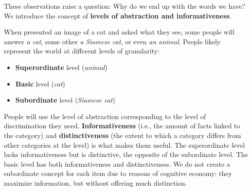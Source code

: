 These observations raise a question: Why do we end up with the words we have?
We introduce the concept of \textbf{levels of abstraction and informativeness}.

When presented an image of a cat and asked what they see, some people will answer \textit{a cat}, some other \textit{a Siamese cat}, or even \textit{an animal}.
People likely represent the world at different levels of 
granularity:
\begin{itemize}
    \item \textbf{Superordinate} level (\textit{animal})
    \item \textbf{Basic} level (\textit{cat})
    \item \textbf{Subordinate} level (\textit{Siamese cat})
\end{itemize}
People will use the level of abstraction corresponding to the level of discrimination they need. 
\textbf{Informativeness} (i.e., the amount of facts linked to the category) and \textbf{distinctiveness} (the extent to which a category differs from other categories at the level) is what makes them useful. The superordinate level lacks informativeness but is distinctive, the opposite of the subordinate level. The basic level has both informativeness and distinctiveness. We do not create a subordinate concept for each item due to reasons of cognitive economy: they maximize information, but without offering much distinction.
